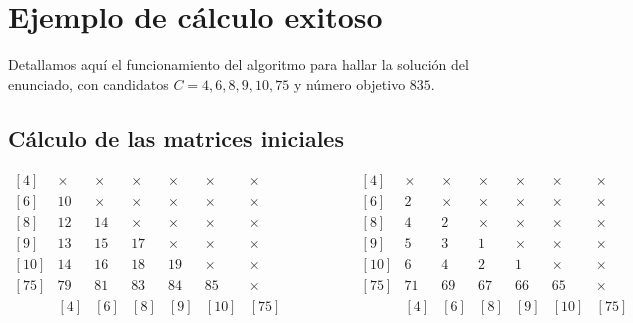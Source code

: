 \chapter{Ejemplo de cálculo exitoso}

Detallamos aquí el funcionamiento del algoritmo para hallar la solución del enunciado, con candidatos $C={4,6,8,9,10,75}$ y número objetivo $835$.

\section{Cálculo de las matrices iniciales}

\begin{center}
$\begin{matrix}
[4]  & \times  & \times  & \times  & \times  & \times  & \times \\
[6]  & 10      & \times  & \times  & \times  & \times  & \times \\
[8]  & 12      & 14      & \times  & \times  & \times  & \times \\
[9]  & 13      & 15      & 17      & \times  & \times  & \times \\
[10] & 14      & 16      & 18      & 19      & \times  & \times \\
[75] & 79      & 81      & 83      & 84      & 85      & \times \\
     &   [4]   &   [6]   &   [8]   &   [9]   &  [10]   &  [75]  \\
\end{matrix}
\ \ \ \ \ \ \ \ \ \ \ \ \ \ \ \ \ \ \ \ \ \ \begin{matrix}
[4]  & \times  & \times  & \times  & \times  & \times  & \times \\
[6]  & 2       & \times  & \times  & \times  & \times  & \times \\
[8]  & 4       & 2       & \times  & \times  & \times  & \times \\
[9]  & 5       & 3       & 1       & \times  & \times  & \times \\
[10] & 6       & 4       & 2       & 1       & \times  & \times \\
[75] & 71      & 69      & 67      & 66      & 65      & \times \\
     &   [4]   &   [6]   &   [8]   &   [9]   &  [10]   &  [75]  \\
\end{matrix}$


\end{center}
